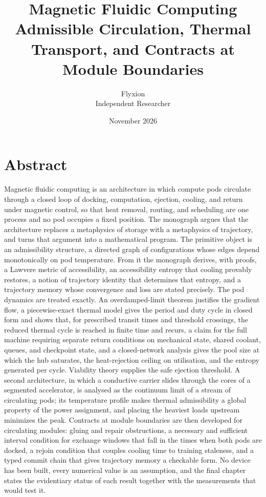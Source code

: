 \documentclass[11pt,openany]{book}
\title{Magnetic Fluidic Computing\\[0.4em]
{\large Admissible Circulation, Thermal Transport, and Contracts at Module Boundaries}}
\author{Flyxion\\Independent Researcher}
\date{November 2026}
\theoremstyle{plain}
\theoremstyle{definition}
\theoremstyle{remark}
\begin{document}
\frontmatter
\maketitle

\chapter*{Abstract}
\noindent
Magnetic fluidic computing is an architecture in which compute pods circulate through a closed loop of docking, computation, ejection, cooling, and return under magnetic control, so that heat removal, routing, and scheduling are one process and no pod occupies a fixed position. The monograph argues that the architecture replaces a metaphysics of storage with a metaphysics of trajectory, and turns that argument into a mathematical program. The primitive object is an admissibility structure, a directed graph of configurations whose edges depend monotonically on pod temperature. From it the monograph derives, with proofs, a Lawvere metric of accessibility, an accessibility entropy that cooling provably restores, a notion of trajectory identity that determines that entropy, and a trajectory memory whose convergence and loss are stated precisely. The pod dynamics are treated exactly. An overdamped-limit theorem justifies the gradient flow, a piecewise-exact thermal model gives the period and duty cycle in closed form and shows that, for prescribed transit times and threshold crossings, the reduced thermal cycle is reached in finite time and recurs, a claim for the full machine requiring separate return conditions on mechanical state, shared coolant, queues, and checkpoint state, and a closed-network analysis gives the pool size at which the hub saturates, the heat-rejection ceiling on utilisation, and the entropy generated per cycle. Viability theory supplies the safe ejection threshold. A second architecture, in which a conductive carrier slides through the cores of a segmented accelerator, is analysed as the continuum limit of a stream of circulating pods; its temperature profile makes thermal admissibility a global property of the power assignment, and placing the heaviest loads upstream minimizes the peak. Contracts at module boundaries are then developed for circulating modules: gluing and repair obstructions, a necessary and sufficient interval condition for exchange windows that fall in the times when both pods are docked, a rejoin condition that couples cooling time to training staleness, and a typed commit chain that gives trajectory memory a checkable form. No device has been built, every numerical value is an assumption, and the final chapter states the evidentiary status of each result together with the measurements that would test it.
\end{document}
